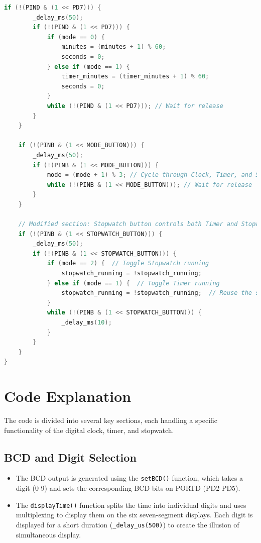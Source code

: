 \documentclass[journal]{IEEEtran}
\begin{document}
\begin{lstlisting}[language=C++, caption={Arduino Code for Digital Clock, Timer, and Stopwatch}]
    if (!(PIND & (1 << PD7))) {
        _delay_ms(50);
        if (!(PIND & (1 << PD7))) {
            if (mode == 0) {
                minutes = (minutes + 1) % 60;
                seconds = 0;
            } else if (mode == 1) {
                timer_minutes = (timer_minutes + 1) % 60;
                seconds = 0;
            }
            while (!(PIND & (1 << PD7))); // Wait for release
        }
    }

    if (!(PINB & (1 << MODE_BUTTON))) {
        _delay_ms(50);
        if (!(PINB & (1 << MODE_BUTTON))) {
            mode = (mode + 1) % 3; // Cycle through Clock, Timer, and Stopwatch
            while (!(PINB & (1 << MODE_BUTTON))); // Wait for release
        }
    }

    // Modified section: Stopwatch button controls both Timer and Stopwatch
    if (!(PINB & (1 << STOPWATCH_BUTTON))) {
        _delay_ms(50);
        if (!(PINB & (1 << STOPWATCH_BUTTON))) {
            if (mode == 2) {  // Toggle Stopwatch running
                stopwatch_running = !stopwatch_running;
            } else if (mode == 1) {  // Toggle Timer running
                stopwatch_running = !stopwatch_running;  // Reuse the same flag
            }
            while (!(PINB & (1 << STOPWATCH_BUTTON))) {
                _delay_ms(10);
            }
        }
    }
}
\end{lstlisting}

\section{Code Explanation}
The code is divided into several key sections, each handling a specific functionality of the digital clock, timer, and stopwatch.

\subsection{BCD and Digit Selection}
\begin{itemize}
    \item The BCD output is generated using the \texttt{setBCD()} function, which takes a digit (0-9) and sets the corresponding BCD bits on PORTD (PD2-PD5).
    \item The \texttt{displayTime()} function splits the time into individual digits and uses multiplexing to display them on the six seven-segment displays. Each digit is displayed for a short duration (\texttt{\_delay\_us(500)}) to create the illusion of simultaneous display.
\end{itemize}
\end{document}
